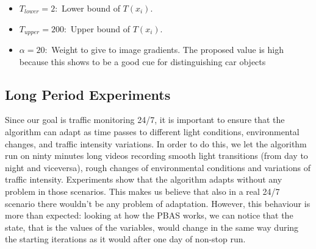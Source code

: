 \begin{itemize}
\item $T_{lower}= 2:$ Lower bound of $T(x_i)$.
\item $T_{upper}= 200:$ Upper bound of $T(x_i)$.
\item $\alpha = 20:$ Weight to give to image gradients. The proposed value is high because this shows to be a good cue for distinguishing car objects
\end{itemize} 

\subsection{Long Period Experiments}
Since our goal is traffic monitoring 24/7, it is important to ensure that the algorithm can adapt as time passes to different light conditions, environmental changes, and traffic intensity variations. In order to do this, we let the algorithm run on ninty minutes long videos recording smooth light transitions (from day to night and viceversa), rough changes of environmental conditions and variations of traffic intensity. Experiments show that the algorithm adapts without any problem in those scenarios. This makes us believe that also in a real 24/7 scenario there wouldn't be any problem of adaptation. However, this behaviour is more than expected: looking at how the PBAS works, we can notice that the state, that is the values of the variables, would change in the same way during the starting iterations as it would after one day of non-stop run. 

